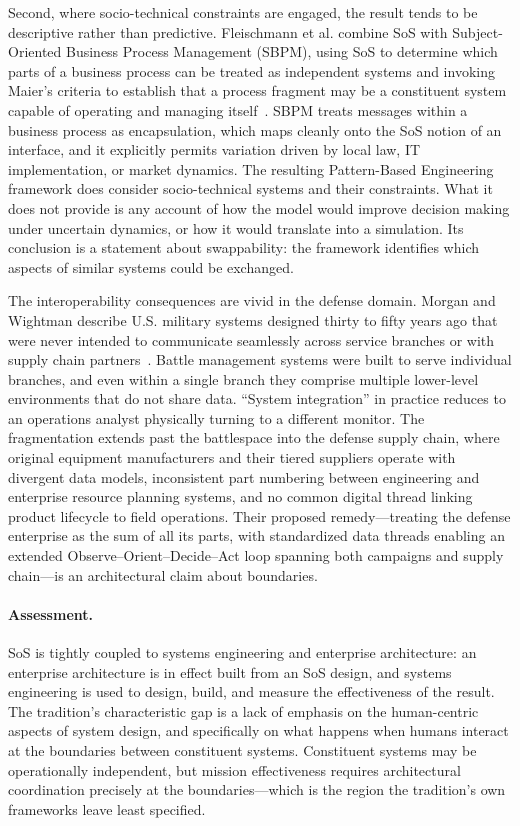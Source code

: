 \documentclass[11pt,a4paper]{article}
\begin{document}
Second, where socio-technical constraints are engaged, the result tends to be
descriptive rather than predictive. Fleischmann et al. combine SoS with
Subject-Oriented Business Process Management (SBPM), using SoS to determine
which parts of a business process can be treated as independent systems and
invoking Maier's criteria to establish that a process fragment may be a
constituent system capable of operating and managing itself~\citep{fleischmann2016}.
SBPM treats messages within a business process as encapsulation, which maps
cleanly onto the SoS notion of an interface, and it explicitly permits variation
driven by local law, IT implementation, or market dynamics. The resulting
Pattern-Based Engineering framework does consider socio-technical systems and
their constraints. What it does not provide is any account of how the model
would improve decision making under uncertain dynamics, or how it would
translate into a simulation. Its conclusion is a statement about swappability:
the framework identifies which aspects of similar systems could be exchanged.

The interoperability consequences are vivid in the defense domain. Morgan and
Wightman describe U.S. military systems designed thirty to fifty years ago that
were never intended to communicate seamlessly across service branches or with
supply chain partners~\citep{morgan2023}. Battle management systems were built
to serve individual branches, and even within a single branch they comprise
multiple lower-level environments that do not share data. ``System integration''
in practice reduces to an operations analyst physically turning to a different
monitor. The fragmentation extends past the battlespace into the defense supply
chain, where original equipment manufacturers and their tiered suppliers operate
with divergent data models, inconsistent part numbering between engineering and
enterprise resource planning systems, and no common digital thread linking
product lifecycle to field operations. Their proposed remedy---treating the
defense enterprise as the sum of all its parts, with standardized data threads
enabling an extended Observe--Orient--Decide--Act loop spanning both campaigns
and supply chain---is an architectural claim about boundaries.

\paragraph{Assessment.} SoS is tightly coupled to systems engineering and
enterprise architecture: an enterprise architecture is in effect built from an
SoS design, and systems engineering is used to design, build, and measure the
effectiveness of the result. The tradition's characteristic gap is a lack of
emphasis on the human-centric aspects of system design, and specifically on what
happens when humans interact at the boundaries between constituent systems.
Constituent systems may be operationally independent, but mission effectiveness
requires architectural coordination precisely at the boundaries---which is the
region the tradition's own frameworks leave least specified.
\end{document}
